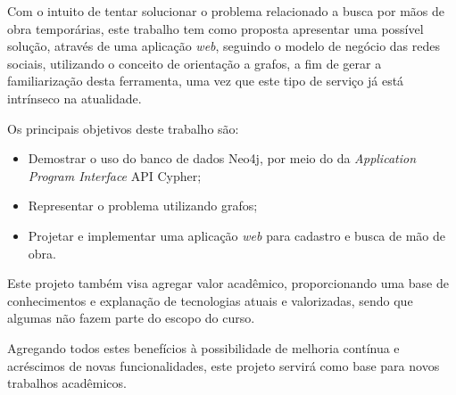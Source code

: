 \par Com o intuito de tentar solucionar o problema relacionado a busca por mãos de obra temporárias, este trabalho tem como proposta apresentar uma possível solução, através de uma aplicação \textit{web}, seguindo o modelo de negócio das redes sociais, utilizando o conceito de orientação a grafos, a fim de gerar a familiarização desta ferramenta, uma vez que este tipo de serviço já está intrínseco na atualidade.

\par Os principais objetivos deste trabalho são:

\begin{itemize}
	\item Demostrar o uso do banco de dados Neo4j, por meio do da \textit{Application Program Interface} API Cypher;
	\item Representar o problema utilizando grafos;
	\item Projetar e implementar uma aplicação \textit{web} para cadastro e busca de mão de obra.
\end{itemize}

\par Este projeto também visa agregar valor acadêmico, proporcionando uma base de conhecimentos e explanação de tecnologias atuais e valorizadas, sendo que algumas não fazem parte do escopo do curso.

\par Agregando todos estes benefícios à possibilidade de melhoria contínua e acréscimos de novas funcionalidades, este projeto servirá como base para novos trabalhos acadêmicos.